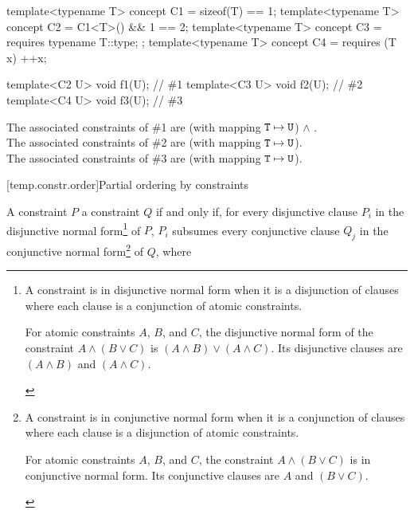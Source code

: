 \pnum
\begin{example}
\begin{codeblock}
template<typename T> concept C1 = sizeof(T) == 1;
template<typename T> concept C2 = C1<T>() && 1 == 2;
template<typename T> concept C3 = requires { typename T::type; };
template<typename T> concept C4 = requires (T x) { ++x; }

template<C2 U> void f1(U);      // \#1
template<C3 U> void f2(U);      // \#2
template<C4 U> void f3(U);      // \#3
\end{codeblock}
The associated constraints of \#1 are
 (with mapping $\texttt{T} \mapsto \texttt{U}$) $\land$ .\\
The associated constraints of \#2 are
 (with mapping $\texttt{T} \mapsto \texttt{U}$).\\
The associated constraints of \#3 are
 (with mapping $\texttt{T} \mapsto \texttt{U}$).
\end{example}

[temp.constr.order]{Partial ordering by constraints}

\pnum
A constraint $P$  a constraint $Q$
if and only if,
for every disjunctive clause $P_i$
in the disjunctive normal form\footnote{
A constraint is in disjunctive normal form when it is a disjunction of
clauses where each clause is a conjunction of atomic constraints.
\begin{example}
For atomic constraints $A$, $B$, and $C$, the disjunctive normal form
of the constraint
$A \land (B \lor C)$
is
$(A \land B) \lor (A \land C)$.
%
Its disjunctive clauses are $(A \land B)$ and $(A \land C)$.
\end{example}%
}
of $P$, $P_i$ subsumes every conjunctive clause $Q_j$
in the conjunctive normal form\footnote{
A constraint is in conjunctive normal form when it is a conjunction
of clauses where each clause is a disjunction of atomic constraints.
\begin{example}
For atomic constraints $A$, $B$, and $C$, the constraint
$A \land (B \lor C)$ is in conjunctive normal form.
%
Its conjunctive clauses are $A$ and $(B \lor C)$.
\end{example}%
}
of $Q$, where

